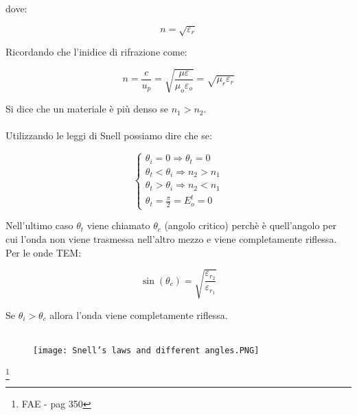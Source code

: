 dove: 

{\Large \begin{equation}
    n = \sqrt{\varepsilon_r}
\end{equation}}

Ricordando che l'inidice di rifrazione come: 

{\Large \begin{equation}
    n = \frac{c}{u_p} = \sqrt{\frac{\mu \varepsilon}{\mu_o \varepsilon_o}} = \sqrt{\mu_r \varepsilon_r}
\end{equation}}


Si dice che un materiale è più denso se $n_1 > n_2$. \\ \\ 

Utilizzando le leggi di Snell possiamo dire che se: 

{\Large \begin{equation}
    \begin{cases}
        \theta_i = 0 \Rightarrow \theta_t = 0 \\ 
        \theta_t < \theta_i \Rightarrow n_2 > n_1 \\ 
        \theta_t > \theta_i \Rightarrow n_2 < n_1 \\ 
        \theta_t = \frac{\pi}{2} = E_o ^{t} = 0
    \end{cases}
\end{equation}}

Nell'ultimo caso $\theta_t$ viene chiamato $\theta_c$ (angolo critico) 
perchè è quell'angolo per cui l'onda non viene trasmessa nell'altro mezzo e viene completamente riflessa. \\ 

Per le onde TEM: 

{\Large \begin{equation}
    \sin(\theta_c) = \sqrt{\frac{\varepsilon_{r_2}}{\varepsilon_{r_1}}}
\end{equation}}

Se $\theta_i > \theta_c$ allora l'onda viene completamente riflessa. \\ \\

\begin{figure}[h]
    \centering
    \texttt{[image: Snell's laws and different angles.PNG]}
    
\end{figure} 

\footnote{FAE - pag 350} 

\newpage 
